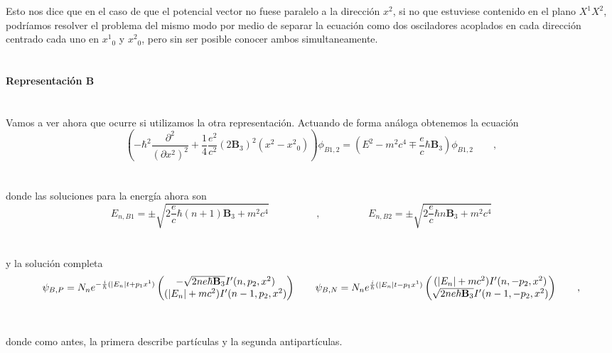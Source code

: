 \documentclass[11pt,letterpaper]{article}     %
\begin{document}
Esto nos dice que en el caso de que el potencial vector no fuese paralelo a la dirección $x^2$, si no que estuviese contenido en el plano $X^1 X^2$, podríamos resolver el problema del mismo modo por medio de separar la ecuación como dos osciladores acoplados en cada dirección centrado cada uno en ${x^1}_0$ y ${x^2}_0$, pero sin ser posible conocer ambos simultaneamente. \\ \\ \\
\textbf{Representación B} \\ \\ \\
Vamos a ver ahora que ocurre si utilizamos la otra representación. Actuando de forma análoga obtenemos la ecuación
\begin{equation}\label{eq:151}
\left(-\hbar^2 \frac{\partial^2}{(\partial x^2)^2}+ \frac{1}{4} \frac{e^2}{c^2}(2 \textbf{B}_3)^2(x^2 - {x^2}_0)\right) \phi_{B1,2}=(E^2 -m^2c^4 \mp \frac{e}{c}\hbar\textbf{B}_3) \phi_{B1,2} \qquad,
\end{equation} \\ \\
donde las soluciones para la energía ahora son
\begin{equation}\label{eq:152}
E_{n,B1}=\pm\sqrt{2\frac{e}{c} \hbar (n+1) \textbf{B}_3 + m^2c^4} \hspace{2cm}, \hspace{2cm } E_{n,B2}=\pm\sqrt{2\frac{e}{c} \hbar n \textbf{B}_3 + m^2c^4} \qquad 
\end{equation} \\ \\
y la solución completa
\begin{equation}\label{eq:153}
\psi_{B,P}=N_n e^{-\frac{i}{\hbar}(|E_n|t + p_1 x^1)} \begin{pmatrix}
-\sqrt{2ne \hbar \textbf{B}_3} I'(n,p_2,x^2) \\ (|E_n| + mc^2)I'(n-1,p_2,x^2)
\end{pmatrix}  \qquad {} $$\\$$
\psi_{B,N}=N_n e^{\frac{i}{\hbar}(|E_n|t - p_1 x^1)} \begin{pmatrix}
(|E_n|+mc^2)I'(n,-p_2,x^2) \\ \sqrt{2ne \hbar \textbf{B}_3} I'(n-1,-p_2,x^2)
\end{pmatrix}  \qquad ,
\end{equation} \\ \\
donde como antes, la primera describe partículas y la segunda antipartículas. \\ \\
\end{document}
